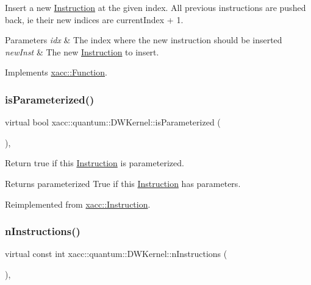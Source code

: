 Insert a new \hyperlink{a01657}{Instruction} at the given index. All previous instructions are pushed back, ie their new indices are current\+Index + 1.


\begin{DoxyParams}{Parameters}
{\em idx} & The index where the new instruction should be inserted \\
\hline
{\em new\+Inst} & The new \hyperlink{a01657}{Instruction} to insert. \\
\hline
\end{DoxyParams}


Implements \hyperlink{a01653_acde702e44bdbc2759b338365218d7ebe}{xacc\+::\+Function}.

\mbox{\label{a01221_a8957ea368244ed4a4ebd85f6bfecb785}} 
\subsubsection{\texorpdfstring{is\+Parameterized()}{isParameterized()}}
{\footnotesize\ttfamily virtual bool xacc\+::quantum\+::\+D\+W\+Kernel\+::is\+Parameterized (\begin{DoxyParamCaption}{ }\end{DoxyParamCaption})\hspace{0.3cm}{\ttfamily [inline]}, {\ttfamily [virtual]}}

Return true if this \hyperlink{a01657}{Instruction} is parameterized.

\begin{DoxyReturn}{Returns}
parameterized True if this \hyperlink{a01657}{Instruction} has parameters. 
\end{DoxyReturn}


Reimplemented from \hyperlink{a01657_a7b24d8ae485369fc2b2df7a3224a5e26}{xacc\+::\+Instruction}.

\mbox{\label{a01221_a79aecc7419a20b8779372ef36fc24806}} 
\subsubsection{\texorpdfstring{n\+Instructions()}{nInstructions()}}
{\footnotesize\ttfamily virtual const int xacc\+::quantum\+::\+D\+W\+Kernel\+::n\+Instructions (\begin{DoxyParamCaption}{ }\end{DoxyParamCaption})\hspace{0.3cm}{\ttfamily [inline]}, {\ttfamily [virtual]}}

